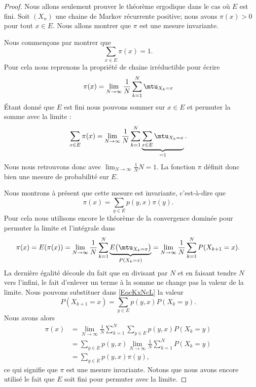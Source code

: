 \begin{proof}
	Nous allons seulement prouver le théorème ergodique dans le cas où \( E\) est fini. Soit \( (X_n)\) une chaine de Markov récurrente positive; nous avons \( \pi(x)>0\) pour tout \( x\in E\). Nous allons montrer que \( \pi\) est une mesure invariante.

	Nous commençons par montrer que
	\begin{equation}
		\sum_{x\in E}\pi(x)=1.
	\end{equation}
	Pour cela nous reprenons la propriété de chaine irréductible pour écrire
	\begin{equation}
		\pi(x)=\lim_{N\to \infty}\frac{1}{ N }\sum_{k=1}^N\mtu_{X_k=x}
	\end{equation}
	Étant donné que \( E\) est fini nous pouvons sommer sur \( x\in E\) et permuter la somme avec la limite :
	\begin{equation}
		\sum_{x\in E}\pi(x)=\lim_{N\to \infty} \frac{1}{ N }\sum_{k=1}^N\underbrace{\sum_{x\in E}\mtu_{X_k=x}}_{=1}.
	\end{equation}
	Nous nous retrouvons donc avec \( \lim_{N\to \infty} \frac{1}{ N }N=1\). La fonction \( \pi\) définit donc bien une mesure de probabilité sur \( E\).

	Nous montrons à présent que cette mesure est invariante, c'est-à-dire que
	\begin{equation}
		\pi(x)=\sum_{y\in E}p(y,x)\pi(y).
	\end{equation}
	Pour cela nous utilisons encore le théorème de la convergence dominée pour permuter la limite et l'intégrale dans
	\begin{equation}        \label{EqcKxNcL}
		\pi(x)=E(\pi(x))=\lim_{N\to \infty} \frac{1}{ N }\sum_{k=1}^N\underbrace{E\big( \mtu_{X_k=x} \big)}_{P(X_k=x)}=\lim_{N\to \infty} \frac{1}{ N }\sum_{k=1}^NP(X_{k+1}=x).
	\end{equation}
	La dernière égalité découle du fait que en divisant par \( N\) et en faisant tendre \( N\) vers l'infini, le fait d'enlever un terme à la somme ne change pas la valeur de la limite. Nous pouvons substituer dans \eqref{EqcKxNcL} la valeur
	\begin{equation}
		P(X_{k+1}=x)=\sum_{y\in E}p(y,x)P(X_k=y).
	\end{equation}
	Nous avons alors
	\begin{subequations}
		\begin{align}
			\pi(x) & =\lim_{N\to \infty} \frac{1}{ N }\sum_{k=1}^N\sum_{y\in E}p(y,x)P(X_k=y) \\
			       & =\sum_{y\in E}p(y,x)\lim_{N\to \infty} \frac{1}{ N }\sum_{k=1}^NP(X_k=y) \\
			       & =\sum_{y\in E}p(y,x)\pi(y),
		\end{align}
	\end{subequations}
	ce qui signifie que \( \pi\) est une mesure invariante. Notons que nous avons encore utilisé le fait que \( E\) soit fini pour permuter avec la limite.


\end{proof}
